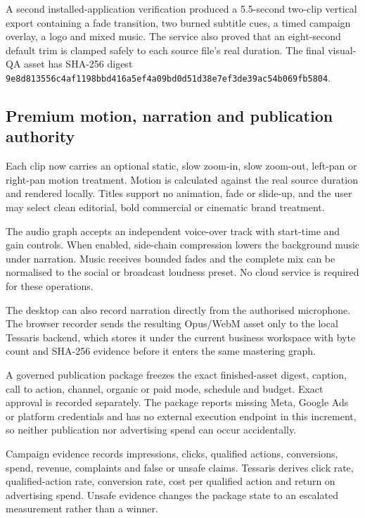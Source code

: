 A second installed-application verification produced a 5.5-second two-clip
vertical export containing a fade transition, two burned subtitle cues, a timed
campaign overlay, a logo and mixed music. The service also proved that an
eight-second default trim is clamped safely to each source file's real duration.
The final visual-QA asset has SHA-256 digest
\texttt{9e8d813556c4af1198bbd416a5ef4a09bd0d51d38e7ef3de39ac54b069fb5804}.

\subsection{Premium motion, narration and publication authority}

Each clip now carries an optional static, slow zoom-in, slow zoom-out, left-pan
or right-pan motion treatment. Motion is calculated against the real source
duration and rendered locally. Titles support no animation, fade or slide-up,
and the user may select clean editorial, bold commercial or cinematic brand
treatment.

The audio graph accepts an independent voice-over track with start-time and gain
controls. When enabled, side-chain compression lowers the background music under
narration. Music receives bounded fades and the complete mix can be normalised to
the social or broadcast loudness preset. No cloud service is required for these
operations.

The desktop can also record narration directly from the authorised microphone.
The browser recorder sends the resulting Opus/WebM asset only to the local
Tessaris backend, which stores it under the current business workspace with byte
count and SHA-256 evidence before it enters the same mastering graph.

A governed publication package freezes the exact finished-asset digest, caption,
call to action, channel, organic or paid mode, schedule and budget. Exact approval
is recorded separately. The package reports missing Meta, Google Ads or platform
credentials and has no external execution endpoint in this increment, so neither
publication nor advertising spend can occur accidentally.

Campaign evidence records impressions, clicks, qualified actions, conversions,
spend, revenue, complaints and false or unsafe claims. Tessaris derives click
rate, qualified-action rate, conversion rate, cost per qualified action and
return on advertising spend. Unsafe evidence changes the package state to an
escalated measurement rather than a winner.

